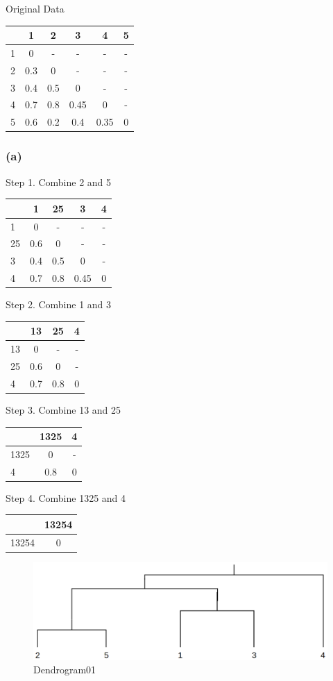 \documentclass[11pt]{article}
\begin{document}
    Original Data

\begin{longtable}[]{@{}lccccc@{}}
\toprule
& 1 & 2 & 3 & 4 & 5\tabularnewline
\midrule
\endhead
1 & 0 & - & - & - & -\tabularnewline
2 & 0.3 & 0 & - & - & -\tabularnewline
3 & 0.4 & 0.5 & 0 & - & -\tabularnewline
4 & 0.7 & 0.8 & 0.45 & 0 & -\tabularnewline
5 & 0.6 & 0.2 & 0.4 & 0.35 & 0\tabularnewline
\bottomrule
\end{longtable}

    \hypertarget{a}{%
\subsubsection{(a)}\label{a}}

Step 1. Combine 2 and 5

\begin{longtable}[]{@{}lcccc@{}}
\toprule
& 1 & 25 & 3 & 4\tabularnewline
\midrule
\endhead
1 & 0 & - & - & -\tabularnewline
25 & 0.6 & 0 & - & -\tabularnewline
3 & 0.4 & 0.5 & 0 & -\tabularnewline
4 & 0.7 & 0.8 & 0.45 & 0\tabularnewline
\bottomrule
\end{longtable}

Step 2. Combine 1 and 3

\begin{longtable}[]{@{}lccc@{}}
\toprule
& 13 & 25 & 4\tabularnewline
\midrule
\endhead
13 & 0 & - & -\tabularnewline
25 & 0.6 & 0 & -\tabularnewline
4 & 0.7 & 0.8 & 0\tabularnewline
\bottomrule
\end{longtable}

Step 3. Combine 13 and 25

\begin{longtable}[]{@{}lcc@{}}
\toprule
& 1325 & 4\tabularnewline
\midrule
\endhead
1325 & 0 & -\tabularnewline
4 & 0.8 & 0\tabularnewline
\bottomrule
\end{longtable}

Step 4. Combine 1325 and 4

\begin{longtable}[]{@{}lc@{}}
\toprule
& 13254\tabularnewline
\midrule
\endhead
13254 & 0\tabularnewline
\bottomrule
\end{longtable}

\begin{figure}
\centering
\includegraphics{./dendrogram01.png}
\caption{Dendrogram01}
\end{figure}
\end{document}
